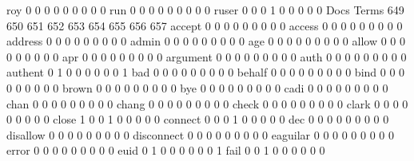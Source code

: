 \documentclass[compress,8pt]{beamer}
\begin{document}
\begin{frame}
\begin{Schunk}
  roy                                        0   0   0   0   0   0   0   0   0
  run                                        0   0   0   0   0   0   0   0   0
  ruser                                      0   0   0   1   0   0   0   0   0
                                          Docs
Terms                                      649 650 651 652 653 654 655 656 657
  accept                                     0   0   0   0   0   0   0   0   0
  access                                     0   0   0   0   0   0   0   0   0
  address                                    0   0   0   0   0   0   0   0   0
  admin                                      0   0   0   0   0   0   0   0   0
  age                                        0   0   0   0   0   0   0   0   0
  allow                                      0   0   0   0   0   0   0   0   0
  apr                                        0   0   0   0   0   0   0   0   0
  argument                                   0   0   0   0   0   0   0   0   0
  auth                                       0   0   0   0   0   0   0   0   0
  authent                                    0   1   0   0   0   0   0   0   1
  bad                                        0   0   0   0   0   0   0   0   0
  behalf                                     0   0   0   0   0   0   0   0   0
  bind                                       0   0   0   0   0   0   0   0   0
  brown                                      0   0   0   0   0   0   0   0   0
  bye                                        0   0   0   0   0   0   0   0   0
  cadi                                       0   0   0   0   0   0   0   0   0
  chan                                       0   0   0   0   0   0   0   0   0
  chang                                      0   0   0   0   0   0   0   0   0
  check                                      0   0   0   0   0   0   0   0   0
  clark                                      0   0   0   0   0   0   0   0   0
  close                                      1   0   0   1   0   0   0   0   0
  connect                                    0   0   0   1   0   0   0   0   0
  dec                                        0   0   0   0   0   0   0   0   0
  disallow                                   0   0   0   0   0   0   0   0   0
  disconnect                                 0   0   0   0   0   0   0   0   0
  eaguilar                                   0   0   0   0   0   0   0   0   0
  error                                      0   0   0   0   0   0   0   0   0
  euid                                       0   1   0   0   0   0   0   0   1
  fail                                       0   0   1   0   0   0   0   0   0

\end{Schunk}
\end{frame}
\end{document}
